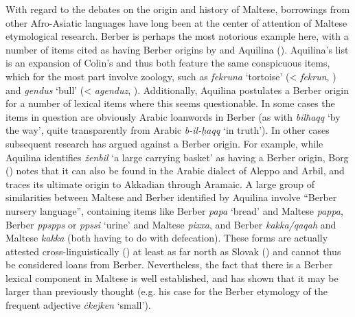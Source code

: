 \documentclass[output=paper]{langsci/langscibook}
\begin{document}
With regard to the debates on the origin and history of Maltese, borrowings from other Afro-Asiatic languages have long been at the center of attention of Maltese etymological research. Berber is perhaps the most notorious example here, with a number of items cited as having Berber origins by \cite{colin1957} and Aquilina (\citeyear[25--39]{aquilina1976}). Aquilina's list is an expansion of Colin's and thus both feature the same conspicuous items, which for the most part involve zoology, such as \textit{fekruna} `tortoise' (< \textit{fekrun}, \citealt[553]{naitzerrad2002}) and \textit{gendus} `bull' (< \textit{agenduz}, \citealt[827]{naitzerrad2002}). 
Additionally, Aquilina postulates a Berber origin for a number of lexical items where this seems questionable. In some cases the items in question are obviously Arabic loanwords in Berber (as with \textit{bilħaqq} `by the way', quite transparently from Arabic \textit{b-il-\d{h}aqq} `in truth'). In other cases subsequent research has argued against a Berber origin. For example, while Aquilina identifies \textit{żenbil} `a large carrying basket' as having a Berber origin, Borg (\citeyear[261]{Borg2004}) notes that it can also be found in the Arabic dialect of Aleppo and Arbil, and traces its ultimate origin to Akkadian through Aramaic. A large group of similarities between Maltese and Berber identified by Aquilina involve ``Berber nursery language'', containing items like Berber \textit{papa} `bread' and Maltese \textit{pappa}, Berber \textit{ppspps} or \textit{ppssi} `urine' and Maltese \textit{pixxa}, and Berber \textit{kakka/qaqah} and Maltese \textit{kakka} (both having to do with defecation). These forms are actually attested cross-linguistically (\citealt{ferguson1964}) at least as far north as Slovak (\citealt{ondrackova2010}) and cannot thus be considered loans from Berber. Nevertheless, the fact that there is a Berber lexical component in Maltese is well established, and \cite{Souag2018berber} has shown that it may be larger than previously thought (e.g. his case for the Berber etymology of the frequent adjective \textit{ċkejken} `small').
\end{document}
